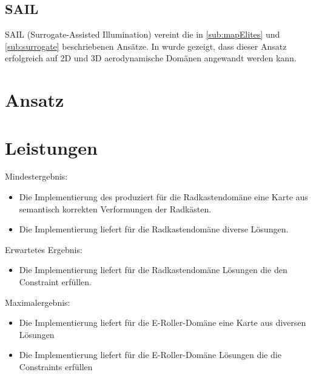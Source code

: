 \documentclass[12pt]{article}
\begin{document}
\subsection{SAIL}

SAIL (Surrogate-Assisted Illumination) vereint die in \ref{sub:mapElites} und \ref{sub:surrogate} beschriebenen Ansätze.
In \cite{Gaier.6152018} wurde gezeigt, dass dieser Ansatz erfolgreich auf 2D und 3D aerodynamische Domänen angewandt werden kann.

\section{Ansatz}


\section{Leistungen}
Mindestergebnis:
\begin{itemize}  
\item Die Implementierung des produziert für die Radkastendomäne eine Karte aus semantisch korrekten Verformungen der Radkästen.
\item Die Implementierung liefert für die Radkastendomäne diverse Lösungen.
\end{itemize}
Erwartetes Ergebnis:
\begin{itemize}  
\item  Die Implementierung liefert für die Radkastendomäne Lösungen die den Constraint erfüllen.
\end{itemize}
Maximalergebnis:
\begin{itemize}  
\item Die Implementierung liefert für die E-Roller-Domäne eine Karte aus diversen Lösungen
\item Die Implementierung liefert für die E-Roller-Domäne Lösungen die die Constraints erfüllen
\end{itemize}

\newpage{}

\end{document}
